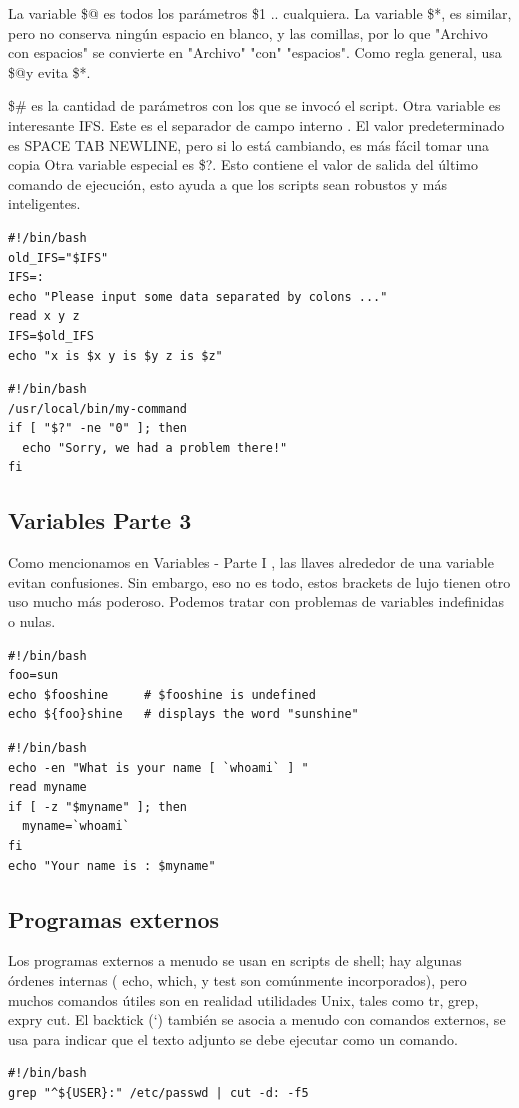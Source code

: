 \documentclass{article}
\begin{document}
La variable \$@ es todos los parámetros \$1 .. cualquiera. La variable \$*, es similar, pero no conserva ningún espacio en blanco, y las comillas, por lo que "Archivo con espacios" se convierte en "Archivo" "con" "espacios". Como regla general, usa \$@y evita \$*. 

\$\# es la cantidad de parámetros con los que se invocó el script.
Otra variable es interesante IFS. Este es el separador de campo interno . El valor predeterminado es SPACE TAB NEWLINE, pero si lo está cambiando, es más fácil tomar una copia
Otra variable especial es \$?. Esto contiene el valor de salida del último comando de ejecución, esto ayuda a que los scripts sean robustos y más inteligentes.
\begin{verbatim}
#!/bin/bash
old_IFS="$IFS"
IFS=:
echo "Please input some data separated by colons ..."
read x y z
IFS=$old_IFS
echo "x is $x y is $y z is $z"
\end{verbatim}

\begin{verbatim}
#!/bin/bash
/usr/local/bin/my-command
if [ "$?" -ne "0" ]; then
  echo "Sorry, we had a problem there!"
fi
\end{verbatim}

\subsection{Variables Parte 3}
Como mencionamos en Variables - Parte I , las llaves alrededor de una variable evitan confusiones. Sin embargo, eso no es todo, estos brackets de lujo tienen otro uso mucho más poderoso. Podemos tratar con problemas de variables indefinidas o nulas.
\begin{verbatim}
#!/bin/bash
foo=sun
echo $fooshine     # $fooshine is undefined
echo ${foo}shine   # displays the word "sunshine"
\end{verbatim}

\begin{verbatim}
#!/bin/bash
echo -en "What is your name [ `whoami` ] "
read myname
if [ -z "$myname" ]; then
  myname=`whoami`
fi
echo "Your name is : $myname"
\end{verbatim}

\subsection{Programas externos}
Los programas externos a menudo se usan en scripts de shell; hay algunas órdenes internas ( echo, which, y test son comúnmente incorporados), pero muchos comandos útiles son en realidad utilidades Unix, tales como tr, grep, expry cut. El backtick (`) también se asocia a menudo con comandos externos, se usa para indicar que el texto adjunto se debe ejecutar como un comando.
\begin{verbatim}
#!/bin/bash
grep "^${USER}:" /etc/passwd | cut -d: -f5
\end{verbatim}
\end{document}
